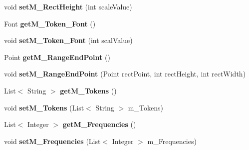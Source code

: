 \begin{DoxyCompactItemize}
void {\bfseries set\+M\+\_\+\+Rect\+Height} (int scale\+Value)
\item 
\mbox{\label{classtranslation_visualization_1_1_item_a18cc9a01736485896b0cef216a418b09}} 
Font {\bfseries get\+M\+\_\+\+Token\+\_\+\+Font} ()
\item 
\mbox{\label{classtranslation_visualization_1_1_item_ad8a3173e7032af6ad2fbc74979a94c99}} 
void {\bfseries set\+M\+\_\+\+Token\+\_\+\+Font} (int scal\+Value)
\item 
\mbox{\label{classtranslation_visualization_1_1_item_ae9f8bd8785d3d8378288b3da10c54d9c}} 
Point {\bfseries get\+M\+\_\+\+Range\+End\+Point} ()
\item 
\mbox{\label{classtranslation_visualization_1_1_item_aa65dd90ed215f0a65c3bb6a8961d6b50}} 
void {\bfseries set\+M\+\_\+\+Range\+End\+Point} (Point rect\+Point, int rect\+Height, int rect\+Width)
\item 
\mbox{\label{classtranslation_visualization_1_1_item_ac593a0d506b03b324f307b5b90ef7134}} 
List$<$ String $>$ {\bfseries get\+M\+\_\+\+Tokens} ()
\item 
\mbox{\label{classtranslation_visualization_1_1_item_ac4ef91c9aae07c63f5fc816f3a2926b4}} 
void {\bfseries set\+M\+\_\+\+Tokens} (List$<$ String $>$ m\+\_\+\+Tokens)
\item 
\mbox{\label{classtranslation_visualization_1_1_item_a67d29022f0ef5b8726cd963c91f0c217}} 
List$<$ Integer $>$ {\bfseries get\+M\+\_\+\+Frequencies} ()
\item 
\mbox{\label{classtranslation_visualization_1_1_item_af67d5013ab3f9b4d5a1c346022a5222e}} 
void {\bfseries set\+M\+\_\+\+Frequencies} (List$<$ Integer $>$ m\+\_\+\+Frequencies)
\item 
\mbox{\label{classtranslation_visualization_1_1_item_ae321c0f43cf7f57adb28d022aac48b57}} 

\end{DoxyCompactItemize}
